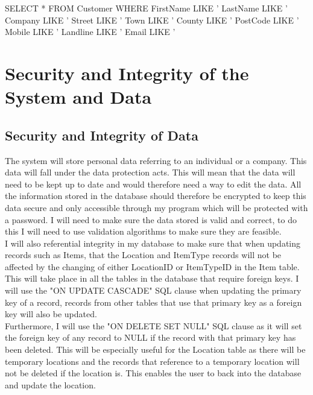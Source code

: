 \begin{sql}
    SELECT * FROM Customer WHERE
	FirstName LIKE '%
	LastName LIKE '%
	Company LIKE '%
	Street LIKE '%
	Town LIKE '%
	County LIKE '%
	PostCode LIKE '%
	Mobile LIKE '%
	Landline LIKE '%
	Email LIKE '%
\end{sql}

\newpage

\section{Security and Integrity of the System and Data}

\subsection{Security and Integrity of Data}

The system will store personal data referring to an individual or a company. This data will fall under the data protection acts. This will mean that the data will need to be kept up to date and would therefore need a way to edit the data. All the information stored in the database should therefore be encrypted to keep this data secure and only accessible through my program which will be protected with a password. I will need to make sure the data stored is valid and correct, to do this I will need to use validation algorithms to make sure they are feasible.\\

\noindent I will also referential integrity in my database to make sure that when updating records such as Items, that the Location and ItemType records will not be affected by the changing of either LocationID or ItemTypeID in the Item table. This will take place in all the tables in the database that require foreign keys. I will use the "ON UPDATE CASCADE" SQL clause when updating the primary key of a record, records from other tables that use that primary key as a foreign key will also be updated.\\

\noindent Furthermore, I will use the "ON DELETE SET NULL" SQL clause as it will set the foreign key of any record to NULL if the record with that primary key has been deleted. This will be especially useful for the Location table as there will be temporary locations and the records that reference to a temporary location will not be deleted if the location is. This enables the user to back into the database and update the location.

